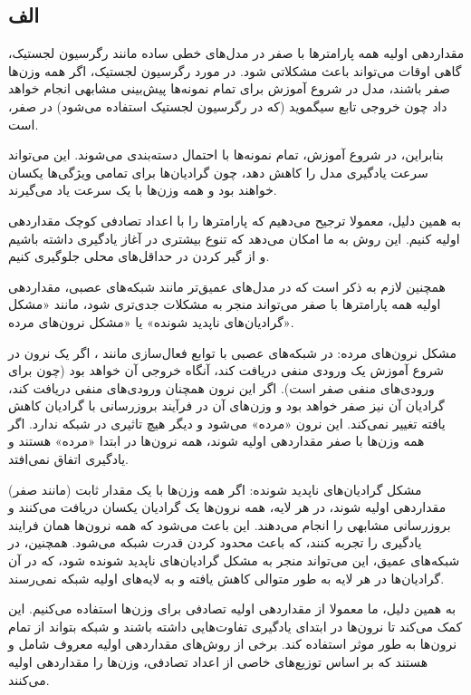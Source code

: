 \subsection*{الف}

مقداردهی اولیه همه پارامترها با صفر در مدل‌های خطی ساده مانند رگرسیون لجستیک، گاهی اوقات می‌تواند باعث مشکلاتی شود. در مورد رگرسیون لجستیک، اگر همه وزن‌ها صفر باشند، مدل در شروع آموزش برای تمام نمونه‌ها پیش‌بینی مشابهی انجام خواهد داد چون خروجی تابع سیگموید (که در رگرسیون لجستیک استفاده می‌شود) در صفر،
است.

بنابراین، در شروع آموزش، تمام نمونه‌ها با احتمال
 دسته‌بندی می‌شوند. این می‌تواند سرعت یادگیری مدل را کاهش دهد، چون گرادیان‌ها برای تمامی ویژگی‌ها یکسان خواهند بود و همه وزن‌ها با یک سرعت یاد می‌گیرند.

به همین دلیل، معمولا ترجیح می‌دهیم که پارامتر‌ها را با اعداد تصادفی کوچک مقداردهی اولیه کنیم. این روش به ما امکان می‌دهد که تنوع بیشتری در آغاز یادگیری داشته باشیم و از گیر کردن در حداقل‌های محلی جلوگیری کنیم.

همچنین لازم به ذکر است که در مدل‌های عمیق‌تر مانند شبکه‌های عصبی، مقداردهی اولیه همه پارامتر‌ها با صفر می‌تواند منجر به مشکلات جدی‌تری شود، مانند «مشکل گرادیان‌های ناپدید شونده» یا «مشکل نرون‌های مرده».

مشکل نرون‌های مرده: در شبکه‌های عصبی با توابع فعال‌سازی مانند
، اگر یک نرون در شروع آموزش یک ورودی منفی دریافت کند، آنگاه خروجی آن
 خواهد بود (چون
 برای ورودی‌های منفی صفر است). اگر این نرون همچنان ورودی‌های منفی دریافت کند، گرادیان آن نیز صفر خواهد بود و وزن‌های آن در فرآیند بروزرسانی با گرادیان کاهش یافته تغییر نمی‌کند. این نرون «مرده» می‌شود و دیگر هیچ تاثیری در شبکه ندارد. اگر همه وزن‌ها با صفر مقداردهی اولیه شوند، همه نرون‌ها در ابتدا «مرده» هستند و یادگیری اتفاق نمی‌افتد.

مشکل گرادیان‌های ناپدید شونده: اگر همه وزن‌ها با یک مقدار ثابت (مانند صفر) مقداردهی اولیه شوند، در هر لایه، همه نرون‌ها یک گرادیان یکسان دریافت می‌کنند و بروزرسانی مشابهی را انجام می‌دهند. این باعث می‌شود که همه نرون‌ها همان فرایند یادگیری را تجربه کنند، که باعث محدود کردن قدرت شبکه می‌شود. همچنین، در شبکه‌های عمیق، این می‌تواند منجر به مشکل گرادیان‌های ناپدید شونده شود، که در آن گرادیان‌ها در هر لایه به طور متوالی کاهش یافته و به لایه‌های اولیه شبکه نمی‌رسند.

به همین دلیل، ما معمولا از مقداردهی اولیه تصادفی برای وزن‌ها استفاده می‌کنیم. این کمک می‌کند تا نرون‌ها در ابتدای یادگیری تفاوت‌هایی داشته باشند و شبکه بتواند از تمام نرون‌ها به طور موثر استفاده کند. برخی از روش‌های مقداردهی اولیه معروف شامل
و
هستند که بر اساس توزیع‌های خاصی از اعداد تصادفی، وزن‌ها را مقداردهی اولیه می‌کنند.

